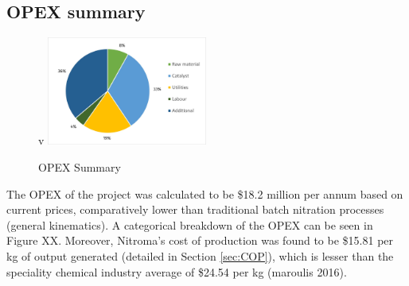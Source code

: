 \subsection{OPEX summary}

\begin{figure}
    \vspace{-1.1cm}
    \caption{OPEX Summary}
    \label{fig:OPEXSummary}
v    \includegraphics[width=0.47\textwidth]{chapters/6-economics/figures/OPEX_summary.jpg}
\end{figure}
The OPEX of the project was calculated to be \$18.2 million per annum based on current prices, comparatively lower than traditional batch nitration processes (general kinematics). A categorical breakdown of the OPEX can be seen in Figure XX. Moreover, Nitroma's cost of production was found to be \$15.81 per kg of output generated (detailed in Section \ref{sec:COP}), which is lesser than the speciality chemical industry average of \$24.54 per kg (maroulis 2016).